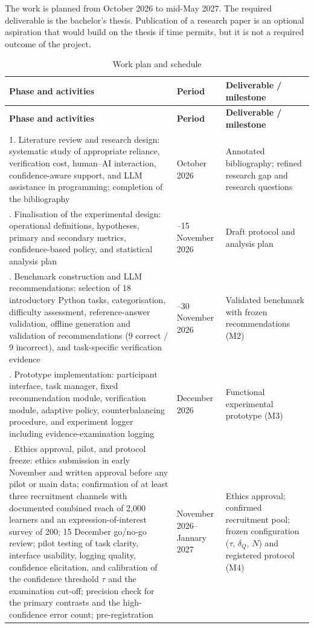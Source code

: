 \documentclass[oneside,final,14pt,a4paper]{extreport}
\begin{document}
The work is planned from October 2026 to mid-May 2027. The required
deliverable is the bachelor's thesis. Publication of a research paper is an
optional aspiration that would build on the thesis if time permits, but it is
not a required outcome of the project.


\small
\begin{longtable}{>{\raggedright\arraybackslash}p{7.4cm}>{\raggedright\arraybackslash}p{2.0cm}>{\raggedright\arraybackslash}p{5.2cm}}
\caption{Work plan and schedule}
\label{tab:workplan} \\
\toprule
\textbf{Phase and activities} & \textbf{Period} &
\textbf{Deliverable / milestone} \\
\midrule
\endfirsthead


\toprule
\textbf{Phase and activities} & \textbf{Period} &
\textbf{Deliverable / milestone} \\
\midrule
\endhead


\bottomrule
\endfoot


1. Literature review and research design:
systematic study of appropriate reliance, verification cost, human--AI
interaction, confidence-aware support, and LLM assistance in programming;
completion of the bibliography &
October 2026 &
Annotated bibliography; refined research gap and research questions \\


2. Finalisation of the experimental design:
operational definitions, hypotheses, primary and secondary metrics,
confidence-based policy, and statistical analysis plan &
1--15 November 2026 &
Draft protocol and analysis plan \\


3. Benchmark construction and LLM recommendations:
selection of 18 introductory Python tasks, categorisation, difficulty
assessment, reference-answer validation, offline generation and validation of
recommendations (9 correct / 9 incorrect), and task-specific verification
evidence &
1--30 November 2026 &
Validated benchmark with frozen recommendations (M2) \\


4. Prototype implementation:
participant interface, task manager, fixed recommendation module, verification
module, adaptive policy, counterbalancing procedure, and experiment logger
including evidence-examination logging &
December 2026 &
Functional experimental prototype (M3) \\


5. Ethics approval, pilot, and protocol freeze:
ethics submission in early November and written approval before any pilot or
main data; confirmation of at least three recruitment channels with documented
combined reach of 2,000 learners and an expression-of-interest survey of 200;
15 December go/no-go review; pilot testing
of task clarity, interface usability, logging quality, confidence elicitation,
and calibration of the confidence threshold $\tau$ and the examination cut-off;
precision check for the primary contrasts and the high-confidence error count;
pre-registration &
November 2026--January 2027 &
Ethics approval; confirmed recruitment pool; frozen configuration
($\tau$, $\delta_Q$, $N$) and registered protocol (M4) \\



\end{longtable}
\end{document}
